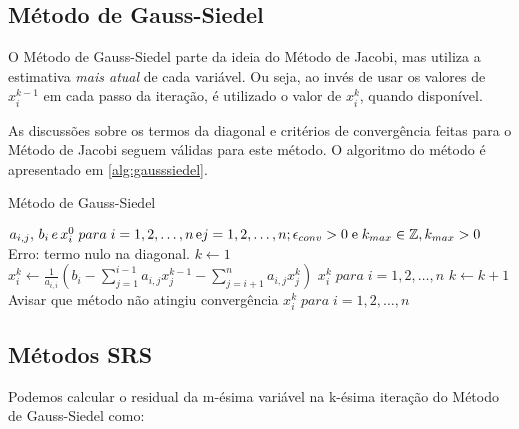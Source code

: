 \documentclass[final,5p]{elsarticle}
\numberwithin{equation}{section}
\begin{document}
    \subsection{Método de Gauss-Siedel}

        O Método de Gauss-Siedel parte da ideia do Método de Jacobi, mas utiliza a estimativa \emph{mais atual} de cada variável. Ou seja, ao invés de usar os valores de $x_i^{k-1}$ em cada passo da iteração, é utilizado o valor de $x_i^k$, quando disponível.

        As discussões sobre os termos da diagonal e critérios de convergência feitas para o Método de Jacobi seguem válidas para este método. O algoritmo do método é apresentado em \ref{alg:gausssiedel}.

        \begin{algorithm}
            \caption{Método de Gauss-Siedel}\label{alg:gausssiedel}
            \begin{algorithmic}
                \Require $a_{i,j},\,b_i\,e\, x_i^0\; para \; i=1,2,\ldots,n\,\text{e}\\j=1,2,\ldots,n;\\\epsilon_{conv} > 0\;\text{e}\; k_{max} \in \mathbb{Z}, k_{max} > 0$
                        \State \Return Erro: termo nulo na diagonal.
                    \EndIf
                \EndFor
                \State $k \gets 1$
                        \State $x_i^k \gets \frac{1}{a_{i,i}} ( b_i - \sum^{i-1}_{j=1} a_{i,j} x_j^{k-1} - \sum^{n}_{j=i+1} a_{i,j} x_j^{k})$
                    \EndFor
                        \State \Return $x_i^k \; para \; i=1,2,\ldots,n$
                    \EndIf
                    \State $k \gets k+1$
                \EndWhile
                \State Avisar que método não atingiu convergência
                \State \Return $x_i^k \; para \; i=1,2,\ldots,n$
            \end{algorithmic}
        \end{algorithm}

    \subsection{Métodos SRS}

        Podemos calcular o residual da m-ésima variável na k-ésima iteração do Método de Gauss-Siedel como:
\end{document}
